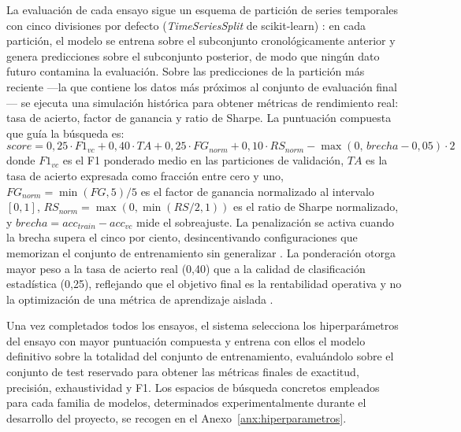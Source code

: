 La evaluación de cada ensayo sigue un esquema de partición de series
temporales con cinco divisiones por defecto (\textit{TimeSeriesSplit} de
scikit-learn) \parencite{pedregosa_scikit_2011}: en cada partición, el modelo
se entrena sobre el subconjunto cronológicamente anterior y genera predicciones
sobre el subconjunto posterior, de modo que ningún dato futuro contamina la
evaluación. Sobre las predicciones de la partición más reciente ---la que
contiene los datos más próximos al conjunto de evaluación final--- se ejecuta
una simulación histórica para obtener métricas de rendimiento real: tasa de
acierto, factor de ganancia y ratio de Sharpe. La puntuación compuesta que
guía la búsqueda es:
\begin{equation}
    \label{eq:composite_score}
    score = 0{,}25 \cdot F1_{vc} + 0{,}40 \cdot TA + 0{,}25 \cdot FG_{norm} + 0{,}10 \cdot RS_{norm} - \max(0,\, brecha - 0{,}05) \cdot 2
\end{equation}
donde $F1_{vc}$ es el F1 ponderado medio en las particiones de validación,
$TA$ es la tasa de acierto expresada como fracción entre cero y uno,
$FG_{norm} = \min(FG, 5) / 5$ es el factor de ganancia normalizado al
intervalo $[0,1]$, $RS_{norm} = \max(0, \min(RS/2, 1))$ es el ratio de Sharpe
normalizado, y $brecha = acc_{train} - acc_{vc}$ mide el sobreajuste. La
penalización se activa cuando la brecha supera el cinco por ciento,
desincentivando configuraciones que memorizan el conjunto de entrenamiento sin
generalizar \parencite{goodfellow_deep_2016}. La ponderación otorga mayor
peso a la tasa de acierto real (0,40) que a la calidad de clasificación
estadística (0,25), reflejando que el objetivo final es la rentabilidad
operativa y no la optimización de una métrica de aprendizaje aislada
\parencite{lopez_de_prado_advances_2018}.

Una vez completados todos los ensayos, el sistema selecciona los
hiperparámetros del ensayo con mayor puntuación compuesta y entrena con ellos
el modelo definitivo sobre la totalidad del conjunto de entrenamiento,
evaluándolo sobre el conjunto de test reservado para obtener las métricas
finales de exactitud, precisión, exhaustividad y F1. Los espacios de búsqueda
concretos empleados para cada familia de modelos, determinados
experimentalmente durante el desarrollo del proyecto, se recogen en el
Anexo~\ref{anx:hiperparametros}.
